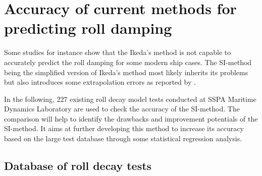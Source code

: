 \section{Accuracy of current methods for predicting roll damping}
\label{se:accuracy_SI_method}
Some studies for instance \parencite{soder_assessment_2019} show that the Ikeda's method is not capable to accurately predict the roll damping for some modern ship cases. The SI-method being the simplified version of Ikeda's method most likely inherits its problems but also introduces some extrapolation errors as reported by \parencite{rudakovic_application_2017}. 

In the following, 227 existing roll decay model tests conducted at SSPA Maritime Dynamics Laboratory are used to check the accuracy of the SI-method. The comparison will help to identify the drawbacks and improvement potentials of the SI-method. It aims at further developing this method to increase its accuracy based on the large test database through some statistical regression analysis.     

\subsection{Database of roll decay tests}
\label{se:database_of_roll_decay_tests}




